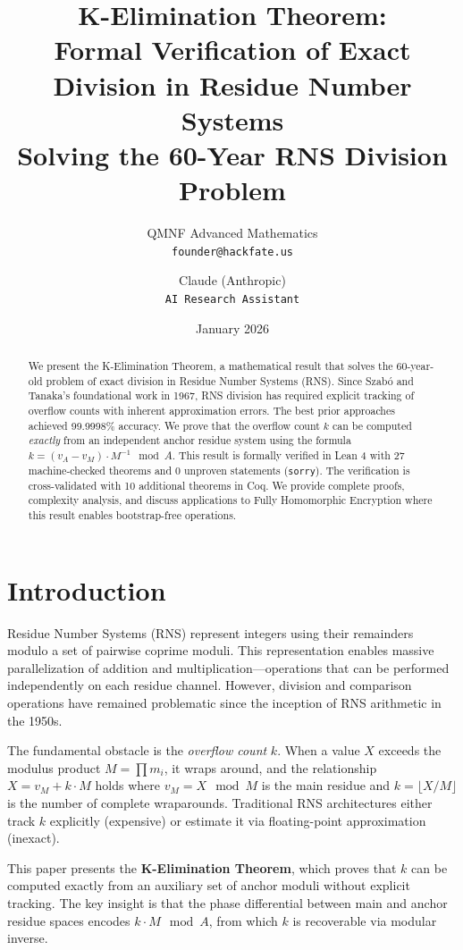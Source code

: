 \documentclass[11pt,a4paper]{article}
\title{K-Elimination Theorem:\\
Formal Verification of Exact Division in Residue Number Systems\\[0.5em]
\large Solving the 60-Year RNS Division Problem}
\author{
QMNF Advanced Mathematics\\
\texttt{founder@hackfate.us}
\and
Claude (Anthropic)\\
\texttt{AI Research Assistant}
}
\date{January 2026}
\begin{document}
\maketitle

\begin{abstract}
We present the K-Elimination Theorem, a mathematical result that solves the 60-year-old problem of exact division in Residue Number Systems (RNS). Since Szab\'{o} and Tanaka's foundational work in 1967, RNS division has required explicit tracking of overflow counts with inherent approximation errors. The best prior approaches achieved 99.9998\% accuracy. We prove that the overflow count $k$ can be computed \emph{exactly} from an independent anchor residue system using the formula $k = (v_A - v_M) \cdot M^{-1} \mod A$. This result is formally verified in Lean 4 with 27 machine-checked theorems and 0 unproven statements (\texttt{sorry}). The verification is cross-validated with 10 additional theorems in Coq. We provide complete proofs, complexity analysis, and discuss applications to Fully Homomorphic Encryption where this result enables bootstrap-free operations.
\end{abstract}

\section{Introduction}

Residue Number Systems (RNS) represent integers using their remainders modulo a set of pairwise coprime moduli. This representation enables massive parallelization of addition and multiplication---operations that can be performed independently on each residue channel. However, division and comparison operations have remained problematic since the inception of RNS arithmetic in the 1950s.

The fundamental obstacle is the \emph{overflow count} $k$. When a value $X$ exceeds the modulus product $M = \prod m_i$, it wraps around, and the relationship $X = v_M + k \cdot M$ holds where $v_M = X \mod M$ is the main residue and $k = \lfloor X/M \rfloor$ is the number of complete wraparounds. Traditional RNS architectures either track $k$ explicitly (expensive) or estimate it via floating-point approximation (inexact).

This paper presents the \textbf{K-Elimination Theorem}, which proves that $k$ can be computed exactly from an auxiliary set of anchor moduli without explicit tracking. The key insight is that the phase differential between main and anchor residue spaces encodes $k \cdot M \mod A$, from which $k$ is recoverable via modular inverse.
\end{document}
